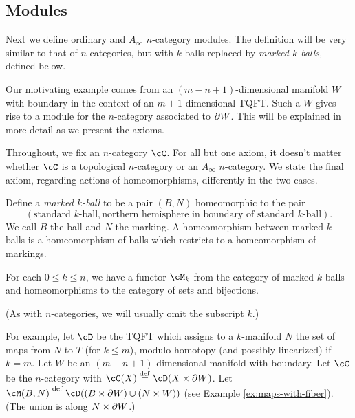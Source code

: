 
\subsection{Modules}

Next we define ordinary and $A_\infty$ $n$-category modules.
The definition will be very similar to that of $n$-categories,
but with $k$-balls replaced by {\it marked $k$-balls,} defined below.

Our motivating example comes from an $(m{-}n{+}1)$-dimensional manifold $W$ with boundary
in the context of an $m{+}1$-dimensional TQFT.
Such a $W$ gives rise to a module for the $n$-category associated to $\partial W$.
This will be explained in more detail as we present the axioms.

Throughout, we fix an $n$-category $\cC$.
For all but one axiom, it doesn't matter whether $\cC$ is a topological $n$-category or an $A_\infty$ $n$-category.
We state the final axiom, regarding actions of homeomorphisms, differently in the two cases.

Define a {\it marked $k$-ball} to be a pair $(B, N)$ homeomorphic to the pair
$$(\text{standard $k$-ball}, \text{northern hemisphere in boundary of standard $k$-ball}).$$
We call $B$ the ball and $N$ the marking.
A homeomorphism between marked $k$-balls is a homeomorphism of balls which
restricts to a homeomorphism of markings.

\begin{module-axiom} \label{module-axiom-funct}
{For each $0 \le k \le n$, we have a functor $\cM_k$ from 
the category of marked $k$-balls and 
homeomorphisms to the category of sets and bijections.}
\end{module-axiom}

(As with $n$-categories, we will usually omit the subscript $k$.)

For example, let $\cD$ be the TQFT which assigns to a $k$-manifold $N$ the set 
of maps from $N$ to $T$ (for $k\le m$), modulo homotopy (and possibly linearized) if $k=m$.
Let $W$ be an $(m{-}n{+}1)$-dimensional manifold with boundary.
Let $\cC$ be the $n$-category with $\cC(X) \deq \cD(X\times \bd W)$.
Let $\cM(B, N) \deq \cD((B\times \bd W)\cup (N\times W))$
(see Example \ref{ex:maps-with-fiber}).
(The union is along $N\times \partial W$.)

